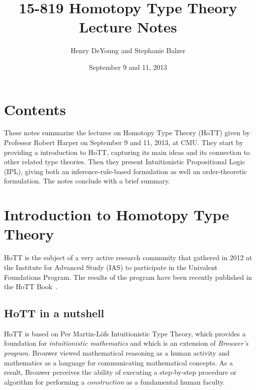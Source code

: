 \documentclass[12pt]{article}
\begin{document}
\title{15-819 Homotopy Type Theory\\ Lecture Notes}
\author{Henry DeYoung and Stephanie Balzer}
\date{September 9 and 11, 2013}

\maketitle





\section{Contents}\label{sec:contents}

These notes summarize the lectures on Homotopy Type Theory (HoTT) given by Professor Robert
Harper on September 9 and 11, 2013, at CMU.  They start by providing a introduction to HoTT,
capturing its main ideas and its connection to other related type theories.  Then they present
Intuitionistic Propositional Logic (IPL), giving both an inference-rule-based formulation as
well an order-theoretic formulation.  The notes conclude with a brief summary.


\section{Introduction to Homotopy Type Theory}\label{sec:intro}

%
%
\gls{HoTT} is the subject of a very active research community that gathered in 2012 at the Institute for Advanced
Study (IAS) to participate in the Univalent Foundations Program.  The results of the program
have been recently published in the HoTT Book~\cite{HoTTBook2013}.

\subsection{HoTT in a nutshell}\label{subsec:hott_in_nutshell}

\gls{HoTT} is based on Per Martin-L\"{o}fs Intuitionistic Type Theory, which provides a
foundation for \emph{intuitionistic mathematics} and which is an extension of \emph{Brouwer's
  program}.  Brouwer viewed mathematical reasoning as a human activity and mathematics as a
language for communicating mathematical concepts.  As a result, Brouwer perceives the ability
of executing a step-by-step procedure or algorithm for performing a \emph{construction} as a
fundamental human faculty.
\end{document}
